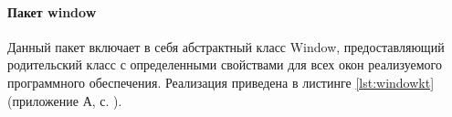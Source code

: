 
\paragraph{Пакет window \newline}
Данный пакет включает в себя абстрактный класс Window, предоставляющий родительский класс с определенными свойствами для всех окон реализуемого программного обеспечения. Реализация приведена в листинге \ref{lst:windowkt} (приложение А, с. \pageref{chp:application-a}).
